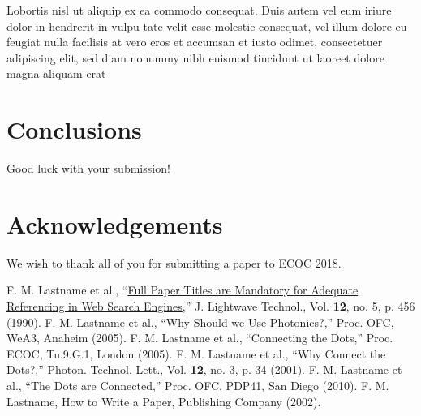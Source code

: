 \documentclass[a4paper, oneside, twocolumn, notitlepage, 10pt]{extarticle_ecoc}
\begin{document}
Lobortis nisl ut aliquip ex ea commodo consequat. Duis autem vel eum
iriure dolor in hendrerit in vulpu tate velit esse molestie
consequat, vel illum dolore eu feugiat nulla facilisis at vero eros
et accumsan et iusto odimet, consectetuer adipiscing elit, sed diam
nonummy nibh euismod tincidunt ut laoreet dolore magna aliquam erat


\section{Conclusions}

Good luck with your submission!


\section{Acknowledgements}

We wish to thank all of you for submitting a paper to ECOC 2018.



\begin{spacing}{1.35}
\begin{thebibliography}{1}
F. M. Lastname et al., ``\uline{Full Paper Titles are Mandatory for Adequate Referencing in Web Search Engines},'' J. Lightwave Technol., Vol. {\bf 12}, no. 5, p. 456 (1990).
F. M. Lastname et al., ``Why Should we Use Photonics?,'' Proc. OFC, WeA3, Anaheim (2005).
F. M. Lastname et al., ``Connecting the Dots,'' Proc. ECOC, Tu.9.G.1, London (2005).
F. M. Lastname et al., ``Why Connect the Dots?,'' Photon. Technol. Lett., Vol. {\bf 12}, no. 3, p. 34 (2001).
F. M. Lastname et al., ``The Dots are Connected,'' Proc. OFC, PDP41, San Diego (2010).
F. M. Lastname, How to Write a Paper, Publishing Company (2002). 
\end{thebibliography}
\end{spacing}
\vspace{-4mm}

\end{document}
